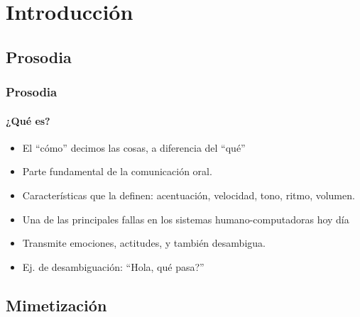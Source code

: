 \section{Introducción}

\subsection{Prosodia}

\begin{frame}
  \frametitle{Prosodia}
  \framesubtitle{¿Qué es?}
  \begin{itemize}
    \item El ``cómo'' decimos las cosas, a diferencia del ``qué''
    \item Parte fundamental de la comunicación oral.
    \item Características que la definen: acentuación, velocidad, tono, ritmo, volumen.
    \item Una de las principales fallas en los sistemas humano-computadoras hoy día
    \item Transmite emociones, actitudes, y también desambigua.
    \item Ej. de desambiguación: ``Hola, qué pasa?''
  \end{itemize}

  \vfill
\end{frame}


\subsection{Mimetización}

